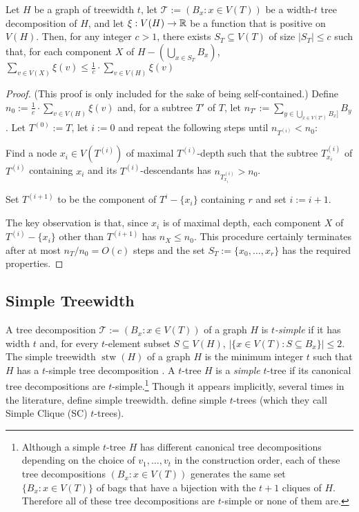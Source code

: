 \documentclass[kpfonts]{patmorin}
\DeclareMathOperator{\stw}{stw}
\theoremstyle{named}
\begin{document}
\begin{lem}\label{weighted-separator}
    Let $H$ be a graph of treewidth $t$, let $\mathcal{T}:=(B_x:x\in V(T))$ be a width-$t$ tree decomposition of $H$, and let $\xi:V(H)\to\mathbb{R}$ be a function that is positive on $V(H)$.  Then, for any integer $c>1$, there exists $S_T\subseteq V(T)$ of size $|S_T|\le c$ such that, for each component $X$ of $H-(\bigcup_{x\in S_T} B_x)$, $\sum_{v\in V(X)} \xi(v) \le \tfrac{1}{c}\cdot\sum_{v\in V(H)} \xi(v)$
\end{lem}

\begin{proof}
    (This proof is only included for the sake of being self-contained.)
    Define $n_0:=\tfrac{1}{c}\cdot\sum_{v\in V(H)} \xi(v)$ and, for a subtree $T'$ of $T$, let $n_{T'}:=\sum_{y\in \bigcup_{x\in V(T')}B_x]} B_y$.  Let $T^{(0)}:=T$, let $i:=0$ and repeat the following steps until $n_{T^{(i)}} < n_0$:
    \begin{compactenum}
        \item Find a node $x_{i}\in V(T^{(i)})$ of maximal $T^{(i)}$-depth such that the subtree $T^{(i)}_{x_i}$ of $T^{(i)}$ containing $x_i$ and its $T^{(i)}$-descendants has $n_{T^{(i)}_{x_i}} > n_0$.

        \item Set $T^{(i+1)}$ to be the component of $T^i-\{x_i\}$ containing $r$ and set $i:=i+1$.
    \end{compactenum}
    The key observation is that, since $x_i$ is of maximal depth, each component $X$ of $T^{(i)}-\{x_i\}$ other than $T^{(i+1)}$ has $n_X\le n_0$.
    This procedure certainly terminates after at most $n_T/n_0 = O(c)$ steps and the set $S_T:=\{x_0,\ldots,x_r\}$ has the required properties.
\end{proof}

\subsection{Simple Treewidth}


A tree decomposition $\mathcal{T}:=(B_x:x\in V(T))$ of a graph $H$ is \emph{$t$-simple} if it has width $t$ and, for every $t$-element subset $S\subseteq V(H)$, $|\{x\in V(T):S\subseteq B_x\}|\le 2$.  The simple treewidth $\stw(H)$ of a graph $H$ is the minimum integer $t$ such that $H$ has a $t$-simple tree decomposition \cite{knauer.ueckerdt:simple}.  A $t$-tree $H$ is a \emph{simple} $t$-tree if its canonical tree decompositions are $t$-simple.\footnote{Although a simple $t$-tree $H$ has different canonical tree decompositions depending on the choice of $v_1,\ldots,v_t$ in the construction order, each of these tree decompositions $(B_x:x\in V(T))$ generates the same set $\{B_x:x\in V(T)\}$ of bags that have a bijection with the $t+1$ cliques of $H$.  Therefore all of these tree decompositions are $t$-simple or none of them are.}  Though it appears implicitly, several times in the literature, \citet{knauer.ueckerdt:simple} define simple treewidth.  \citet{markenzon.justel.ea:subclasses} define simple $t$-trees (which they call Simple Clique (SC) $t$-trees).
\end{document}
